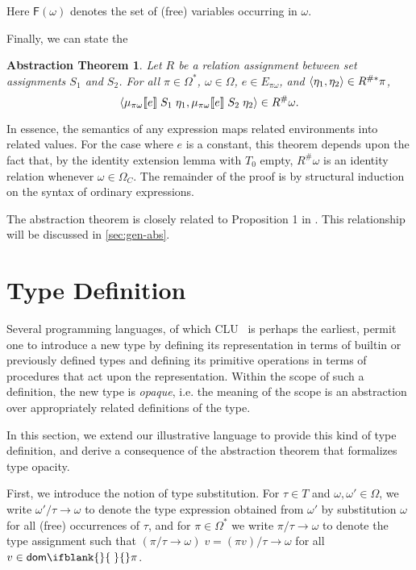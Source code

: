 \documentclass[sigplan,screen,nonacm,balance=false]{acmart}
\makeatletter
\theoremstyle{plain}
\DeclarePairedDelimiter{\pair}{\langle}{\rangle}
\DeclarePairedDelimiter{\interp}{\llbracket}{\rrbracket}
\newcommand{\ie}{i.e.\@\xspace}
\newcommand{\dom}[1]{\mathsf{dom}\ifblank{#1}{\;}{#1}}
\newcommand{\FV}{\mathsf{F}}
\makeatother
\begin{document}
Here $\FV(\omega)$ denotes the set of (free) variables occurring in $\omega$.

Finally, we can state the

\newtheorem*{abstraction}{Abstraction Theorem}
\begin{abstraction}
  Let $R$ be a relation assignment between set assignments $S_1$ and $S_2$.
  For all $\pi \in \Omega^*$, $\omega \in \Omega$, $e \in E_{\pi \omega}$, and $\pair{\eta_1, \eta_2} \in R^{\#*} \pi$,
  \begin{equation*}
    \pair{\mu_{\pi \omega} \interp{e} \; S_1 \; \eta_1, \mu_{\pi \omega} \interp{e} \; S_2 \; \eta_2} \in R^\# \omega.
  \end{equation*}
\end{abstraction}

In essence, the semantics of any expression maps related environments into related values.
For the case where $e$ is a constant, this theorem depends upon the fact that, by the identity extension lemma with $T_0$ empty, $R^\# \omega$ is an identity relation whenever $\omega \in \Omega_C$.
The remainder of the proof is by structural induction on the syntax of ordinary expressions.

The abstraction theorem is closely related to Proposition 1 in \citep{definability}.
This relationship will be discussed in \cref{sec:gen-abs}.

\section{Type Definition} \label{sec:type-def}

Several programming languages, of which CLU~\citep{CLU} is perhaps the earliest, permit one to introduce a new type by defining its representation in terms of builtin or previously defined types and defining its primitive operations in terms of procedures that act upon the representation.
Within the scope of such a definition, the new type is \emph{opaque}, \ie the meaning of the scope is an abstraction over appropriately related definitions of the type.

In this section, we extend our illustrative language to provide this kind of type definition, and derive a consequence of the abstraction theorem that formalizes type opacity.

First, we introduce the notion of type substitution.
For $\tau \in T$ and $\omega, \omega' \in \Omega$, we write $\omega'/\tau \to \omega$ to denote the type expression obtained from $\omega'$ by substitution $\omega$ for all (free) occurrences of $\tau$, and for $\pi \in \Omega^*$ we write $\pi/\tau \to \omega$ to denote the type assignment such that $(\pi/\tau \to \omega) \; v = (\pi v)/\tau \to \omega$ for all $v \in \dom{} \pi$.
\end{document}
